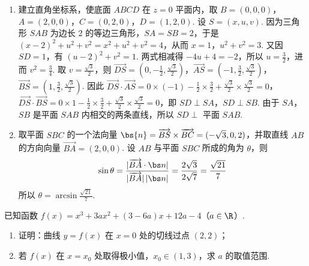 \begin{solution}
\begin{enumerate}
\item 建立直角坐标系，使底面 \(ABCD\) 在 \(z=0\) 平面内，取 \(B=(0,0,0)\)，\(A=(2,0,0)\)，\(C=(0,2,0)\)，\(D=(1,2,0)\). 设 \(S=(x,u,v)\). 因为三角形 \(SAB\) 为边长 \(2\) 的等边三角形，\(SA=SB=2\)，于是 \((x-2)^2+u^2+v^2=x^2+u^2+v^2=4\)，从而 \(x=1\)，\(u^2+v^2=3\). 又因 \(SD=1\)，有 \((u-2)^2+v^2=1\). 两式相减得 \(-4u+4=-2\)，所以 \(u=\frac{3}{2}\)，进而 \(v^2=\frac{3}{4}\). 取 \(v=\frac{\sqrt{3}}{2}\)，则
\(\overrightarrow{DS}=(0,-\frac{1}{2},\frac{\sqrt{3}}{2})\)，\(\overrightarrow{AS}=(-1,\frac{3}{2},\frac{\sqrt{3}}{2})\)，\(\overrightarrow{BS}=(1,\frac{3}{2},\frac{\sqrt{3}}{2})\). 因此 \(\overrightarrow{DS}\cdot\overrightarrow{AS}=0\times(-1)-\frac{1}{2}\times\frac{3}{2}+\frac{\sqrt{3}}{2}\times\frac{\sqrt{3}}{2}=0\)，\(\overrightarrow{DS}\cdot\overrightarrow{BS}=0\times1-\frac{1}{2}\times\frac{3}{2}+\frac{\sqrt{3}}{2}\times\frac{\sqrt{3}}{2}=0\)，即 \(SD\perp SA\)，\(SD\perp SB\). 由于 \(SA\)，\(SB\) 是平面 \(SAB\) 内相交的两条直线，所以 \(SD\perp\) 平面 \(SAB\).

\item 取平面 \(SBC\) 的一个法向量 \(\bs{n}=\overrightarrow{BS}\times\overrightarrow{BC}=(-\sqrt{3},0,2)\)，并取直线 \(AB\) 的方向向量 \(\overrightarrow{BA}=(2,0,0)\). 设 \(AB\) 与平面 \(SBC\) 所成的角为 \(\theta\)，则
\[
\sin\theta=\frac{|\overrightarrow{BA}\cdot\bs n|}{|\overrightarrow{BA}|\,|\bs n|}=\frac{2\sqrt{3}}{2\sqrt{7}}=\frac{\sqrt{21}}{7}
\]
所以 \(\theta=\arcsin\frac{\sqrt{21}}{7}\).
\end{enumerate}
\end{solution}

\begin{problem}
已知函数 \(f(x)=x^3+3ax^2+(3-6a)x+12a-4\)（\(a\in\R\)）.

\begin{enumerate}
\item 证明：曲线 \(y=f(x)\) 在 \(x=0\) 处的切线过点 \((2,2)\)；
\item 若 \(f(x)\) 在 \(x=x_0\) 处取得极小值，\(x_0\in(1,3)\)，求 \(a\) 的取值范围.
\end{enumerate}
\end{problem}

